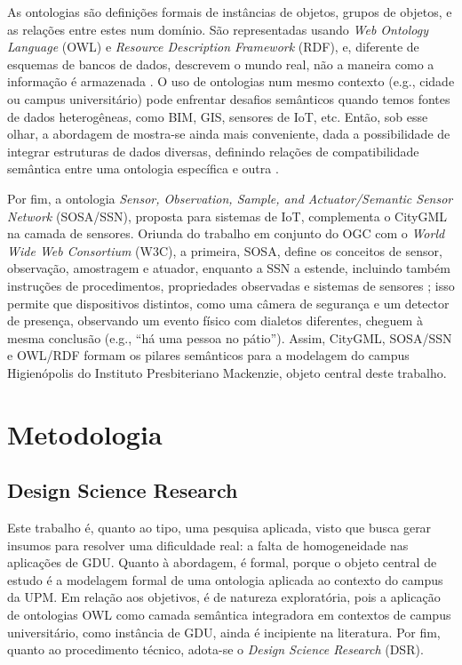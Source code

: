 \documentclass[
  article,   %
  11pt,      %
  oneside,   %
  a4paper,   %
  english,   %
  brazil,    %
  sumario=tradicional
]{abntex2}
\newcommand{\en}[1]{\foreignlanguage{english}{\textit{#1}}}
\begin{document}
As ontologias são definições formais de instâncias de objetos, grupos de objetos, e as relações
entre estes num domínio.
São representadas usando \en{Web Ontology Language} (OWL) e \en{Resource Description Framework}
(RDF), e, diferente de esquemas de bancos de dados, descrevem o mundo real, não a maneira como a
informação é armazenada \cite{metral_ontologybased_2010}.
O uso de ontologias num mesmo contexto (e.g., cidade ou campus universitário) pode enfrentar
desafios semânticos quando temos fontes de dados heterogêneas, como BIM, GIS, sensores de IoT, etc.
Então, sob esse olhar, a abordagem de  mostra-se ainda mais
conveniente, dada a possibilidade de integrar estruturas de dados diversas, definindo relações de
compatibilidade semântica entre uma ontologia específica e outra \cite{SHI2023102114}.

Por fim, a ontologia \en{Sensor, Observation, Sample, and Actuator/Semantic Sensor Network}
(SOSA/SSN), proposta para sistemas de IoT, complementa o CityGML na camada de sensores.
Oriunda do trabalho em conjunto do OGC com o \en{World Wide Web Consortium} (W3C), a primeira,
SOSA, define os conceitos de sensor, observação, amostragem e atuador, enquanto a SSN a estende,
incluindo também instruções de procedimentos, propriedades observadas e sistemas de sensores
\cite{haller2019}; isso permite que dispositivos distintos, como uma câmera de segurança e um
detector de presença, observando um evento físico com dialetos diferentes, cheguem à mesma
conclusão (e.g., ``há uma pessoa no pátio'').
Assim, CityGML, SOSA/SSN e OWL/RDF formam os pilares semânticos para a modelagem do campus
Higienópolis do Instituto Presbiteriano Mackenzie, objeto central deste trabalho.

\section{Metodologia}

\subsection{Design Science Research}

Este trabalho é, quanto ao tipo, uma pesquisa aplicada, visto que busca gerar insumos para resolver
uma dificuldade real: a falta de homogeneidade nas aplicações de GDU.
Quanto à abordagem, é formal, porque o objeto central de estudo é a modelagem formal de uma
ontologia aplicada ao contexto do campus da UPM.
Em relação aos objetivos, é de natureza exploratória, pois a aplicação de ontologias OWL como
camada semântica integradora em contextos de campus universitário, como instância de GDU, ainda é
incipiente na literatura.
Por fim, quanto ao procedimento técnico, adota-se o \en{Design Science Research} (DSR).
\end{document}
